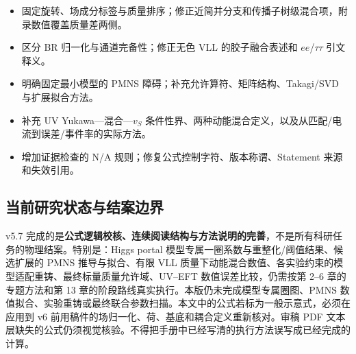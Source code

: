 \documentclass[
  chinese,
  UTF8]{ctexart}
\providecommand{\tightlist}{%
  \setlength{\itemsep}{0pt}\setlength{\parskip}{0pt}}
\begin{document}
\begin{itemize}
\tightlist
\item
  固定旋转、场成分标签与质量排序；修正近简并分支和传播子树级混合项，附录数值覆盖质量差两侧。
\item
  区分 BR 归一化与通道完备性；修正无色 VLL 的胶子融合表述和
  \(ee\)/\(\tau\tau\) 引文释义。
\item
  明确固定最小模型的 PMNS 障碍；补充允许算符、矩阵结构、Takagi/SVD
  与扩展拟合方法。
\item
  补充 UV Yukawa---混合---\(v_S\)
  条件性界、两种动能混合定义，以及从匹配/电流到误差/事件率的实际方法。
\item
  增加证据检查的 N/A 规则；修复公式控制字符、版本称谓、Statement
  来源和失效引用。
\end{itemize}

\subsection{当前研究状态与结案边界}\label{ux5f53ux524dux7814ux7a76ux72b6ux6001ux4e0eux7ed3ux6848ux8fb9ux754c}

v5.7
完成的是\textbf{公式逻辑校核、连续阅读结构与方法说明的完善}，不是所有科研任务的物理结案。特别是：Higgs
portal 模型专属一圈系数与重整化/阈值结果、候选扩展的 PMNS
推导与拟合、有限 VLL
质量下动能混合数值、各实验约束的模型适配重铸、最终标量质量允许域、UV--EFT
数值误差比较，仍需按第 2--6 章的专题方法和第 13
章的阶段路线真实执行。本版仍未完成模型专属圈图、PMNS
数值拟合、实验重铸或最终联合参数扫描。本文中的公式若标为一般示意式，必须在应用到
v6 前用稿件的场归一化、荷、基底和耦合定义重新核对。审稿 PDF
文本层缺失的公式仍须视觉核验。不得把手册中已经写清的执行方法误写成已经完成的计算。
\end{document}
